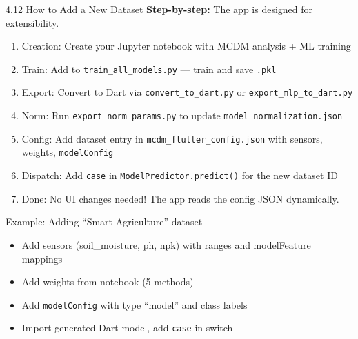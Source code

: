 \documentclass[aspectratio=169]{beamer}
\begin{document}
\begin{frame}{4.12 How to Add a New Dataset}
  \textbf{Step-by-step:} The app is designed for extensibility.

  \vspace{0.3cm}
  \begin{enumerate}
    \item \alert{Creation:} Create your Jupyter notebook with MCDM analysis + ML training
    \item \alert{Train:} Add to \texttt{train\_all\_models.py} --- train and save \texttt{.pkl}
    \item \alert{Export:} Convert to Dart via \texttt{convert\_to\_dart.py} or \texttt{export\_mlp\_to\_dart.py}
    \item \alert{Norm:} Run \texttt{export\_norm\_params.py} to update \texttt{model\_normalization.json}
    \item \alert{Config:} Add dataset entry in \texttt{mcdm\_flutter\_config.json} with sensors, weights, \texttt{modelConfig}
    \item \alert{Dispatch:} Add \texttt{case} in \texttt{ModelPredictor.predict()} for the new dataset ID
    \item \alert{Done:} No UI changes needed! The app reads the config JSON dynamically.
  \end{enumerate}

  \vspace{0.3cm}
  \begin{block}{Example: Adding ``Smart Agriculture'' dataset}
    \begin{itemize}
      \item Add sensors (soil\_moisture, ph, npk) with ranges and modelFeature mappings
      \item Add weights from notebook (5 methods)
      \item Add \texttt{modelConfig} with type ``model'' and class labels
      \item Import generated Dart model, add \texttt{case} in switch
    \end{itemize}
  \end{block}
\end{frame}
\end{document}
